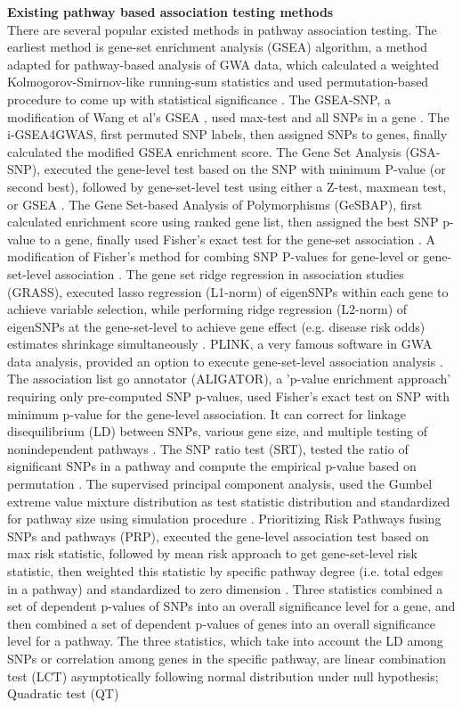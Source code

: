 \documentclass[12pt]{article}
\begin{document}
\textbf{Existing pathway based association testing methods}\\
There are several popular existed methods in pathway association testing.  The earliest method is gene-set enrichment analysis (GSEA) algorithm, a method adapted for pathway-based analysis of GWA data, which calculated a weighted Kolmogorov-Smirnov-like running-sum statistics and used permutation-based procedure to come up with statistical significance \cite{wang2007pathway}. The GSEA-SNP, a modification of Wang et al's GSEA \cite{wang2007pathway}, used max-test and all SNPs in a gene \cite{Holden2008}. The i-GSEA4GWAS, first permuted SNP labels, then assigned SNPs to genes, finally calculated the modified GSEA enrichment score\cite{Zhang2010a}. The Gene Set Analysis (GSA-SNP), executed the gene-level test based on the SNP with minimum P-value (or second best), followed by gene-set-level test using either a Z-test, maxmean test, or GSEA \cite{Nam2010}. The Gene Set-based Analysis of Polymorphisms (GeSBAP), first calculated enrichment score using ranked gene list, then assigned the best SNP p-value to a gene, finally used Fisher's exact test for the gene-set association \cite{Medina2009}. A modification of Fisher’s method for combing SNP P-values for gene-level or gene-set-level association \cite{DelaCruz2010}. The gene set ridge regression in association studies (GRASS), executed lasso regression (L1-norm) of eigenSNPs within each gene to achieve variable selection, while performing ridge regression (L2-norm) of eigenSNPs at the gene-set-level to achieve gene effect (e.g. disease risk odds) estimates shrinkage simultaneously \cite{Chen2010}. PLINK, a very famous software in GWA data analysis, provided an option to execute gene-set-level association analysis \cite{Purcell2007}. The association list go annotator (ALIGATOR), a 'p-value enrichment approach' requiring only pre-computed SNP p-values, used Fisher's exact test on SNP with minimum p-value for the gene-level association. It can correct for linkage disequilibrium (LD) between SNPs, various gene size, and multiple testing of nonindependent pathways \cite{Holmans2009}. The SNP ratio test (SRT), tested the ratio of significant SNPs in a pathway and compute the empirical p-value based on permutation \cite{ODushlaine2009}. The supervised principal component analysis, used the Gumbel extreme value mixture distribution as test statistic distribution and standardized for pathway size using simulation procedure \cite{Chen2010a}. Prioritizing Risk Pathways fusing SNPs and pathways (PRP), executed the gene-level association test based on max risk statistic, followed by mean risk approach to get gene-set-level risk statistic, then weighted this statistic by specific pathway degree (i.e. total edges in a pathway) and standardized to zero dimension \cite{Chen2009}. Three statistics combined a set of dependent p-values of SNPs into an overall significance level for a gene, and then combined a set of dependent p-values of genes into an overall significance level for a pathway. The three statistics, which take into account the LD among SNPs or correlation among genes in the specific pathway, are linear combination test (LCT) asymptotically following normal distribution under null hypothesis; Quadratic test (QT) 
\end{document}
